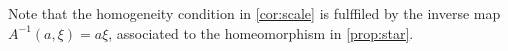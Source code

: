 Note that the homogeneity condition in \cref{cor:scale} is fulffiled by the inverse map $A^{-1}(a,\xi)=a\xi$, associated to the homeomorphism in \cref{prop:star}. 





